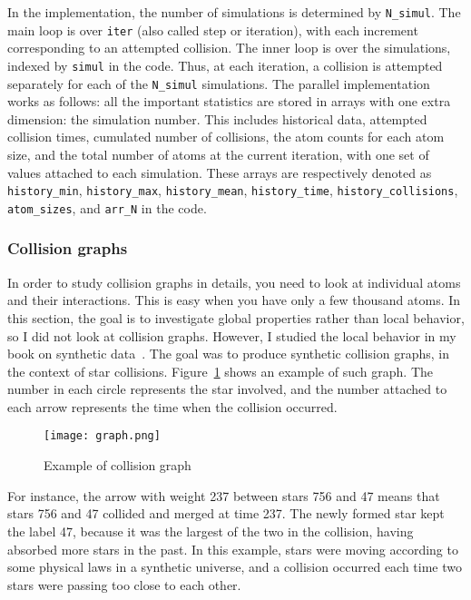 \documentclass[oneside,10pt]{book}
\begin{document}
In the implementation, the number of simulations is determined by \texttt{N\_simul}. The main loop is over \texttt{iter} (also
 called step or iteration), with each increment corresponding to an attempted collision. The inner loop is over the simulations, indexed by \texttt{simul} in the code. Thus, at each iteration, a collision is attempted separately for each of the \texttt{N\_simul}
 simulations.  The parallel implementation works as follows: all the important statistics are stored in arrays with one extra dimension: the simulation number. This includes historical data, attempted collision times, cumulated number of collisions, the atom counts for each atom size, and the total number of atoms at the current iteration, with one set of values attached to each simulation. These arrays are respectively denoted as
 \texttt{history\_min}, \texttt{history\_max}, \texttt{history\_mean},
 \texttt{history\_time},
 \texttt{history\_collisions},
 \texttt{atom\_sizes}, and
 \texttt{arr\_N}
 in the code.

\subsubsection{Collision graphs}

In order to study collision graphs in details, you need to look at individual atoms and their interactions. This is easy
 when you have only a few thousand atoms. In this section, the goal is to investigate global properties rather than local
 behavior, so I did not look at collision graphs. However, I studied the local behavior in my book on synthetic data~\cite{vgelsevier}. The goal was to produce
 synthetic collision graphs, in the context of star collisions. Figure~\ref{fig:pi1238675} shows an example of such graph.
 The number in each circle represents the star involved, and the number attached to each arrow represents the time when the collision occurred.


\begin{figure}[H]
\centering
\texttt{[image: graph.png]}
\caption{Example of collision graph}
\label{fig:pi1238675}
\end{figure}

For instance, the arrow with weight 237 between stars 756 and 47 means that stars 756 and 47 collided and merged at time 237. The newly formed star kept the label 47, because it was the largest of the two in the collision, having absorbed more stars in the past. In this example,
 stars were moving according to some physical laws in a synthetic universe, and a collision occurred each time two stars were passing too close to each other.
\end{document}

